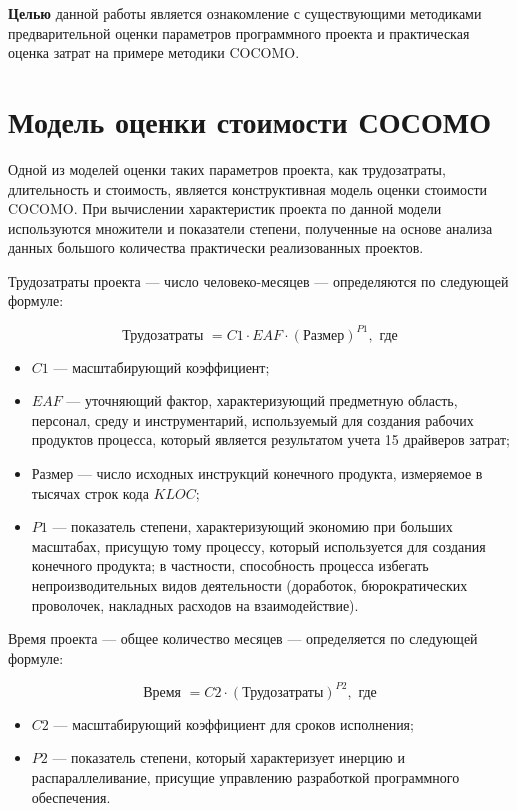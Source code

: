 \textbf{Целью} данной работы является ознакомление с существующими методиками предварительной оценки параметров программного проекта и практическая оценка затрат на примере методики COCOMO.

\section*{Модель оценки стоимости СОСОМО}

Одной из моделей оценки таких параметров проекта, как трудозатраты, длительность и стоимость, является конструктивная модель оценки стоимости COCOMO. При вычислении характеристик проекта по данной модели используются множители и показатели степени, полученные на основе анализа данных большого количества практически реализованных проектов.

Трудозатраты проекта --- число человеко-месяцев --- определяются по следующей формуле:

\begin{equation}
	\text{Трудозатраты } = C1 \cdot EAF \cdot (\text{Размер})^{P1}, \text{ где}
\end{equation}

\begin{itemize}
	\item $C1$ --- масштабирующий коэффициент;
	\item $EAF$ --- уточняющий фактор, характеризующий предметную область, персонал, среду и инструментарий, используемый для создания рабочих продуктов процесса, который является результатом учета 15 драйверов затрат;
	\item Размер --- число исходных инструкций конечного продукта, измеряемое в тысячах строк кода $KLOC$;
	\item $P1$ --- показатель степени, характеризующий экономию при больших масштабах, присущую тому процессу, который используется для создания конечного продукта; в частности, способность процесса избегать непроизводительных видов деятельности (доработок, бюрократических проволочек, накладных расходов на взаимодействие).
\end{itemize}

Время проекта --- общее количество месяцев --- определяется по следующей формуле:

\begin{equation}
	\text{Время } = C2 \cdot(\text{Трудозатраты})^{P2}, \text{ где}
\end{equation}

\begin{itemize}
	\item $C2$ --- масштабирующий коэффициент для сроков исполнения;
	\item $P2$ --- показатель степени, который характеризует инерцию и распараллеливание, присущие управлению разработкой программного обеспечения.
\end{itemize}

